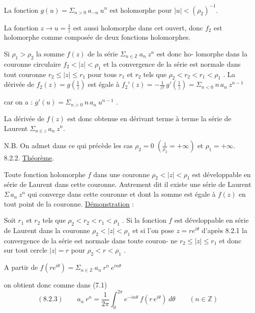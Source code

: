 
La fonction $g(u) = \Sigma_{n > 0}\ a_{-n}\ u^{n}$ est holomorphe pour $|u| < (\rho_2)^{-1}$.

La fonction $z \longrightarrow u = \frac{1}{z}$ est aussi holomorphe dans cet ouvert, donc $f_2$ est
holomorphe comme composée de deux fonctions holomorphes.

Si $\rho_1 > \rho_2$ la somme $f(z)$ de la série $\Sigma_{n \in \mathbb{Z}}\ a_n\ z^{n}$ est donc ho-%
lomorphe dans la couronne circulaire $f_2 < |z| < \rho_1$ et la convergence de la
série est normale dans tout couronne $r_2 \leq |z| \leq r_1$ pour tous $r_1$ et $r_2$ tels
que $\rho_2 < r_2 < r_1 < \rho_1$ .
La dérivée de $f_2(z) = g(\frac{1}{z})$ est égale à $f_2'(z) = - \frac{1}{z^2}\, g'(\frac{1}{z}) = \Sigma_{n < 0}\ n\, a_n\ z^{n-1}$

car on a : \quad $g'(u) = \Sigma_{n > 0}\ n\, a_n\ u^{n-1}$ .

La dérivée de $f(z)$ est donc obtenue en dérivant terme à terme la série de
Laurent $\Sigma_{n \in z}\ a_n\ z^{n}$.

N.B. On admet dans ce qui précède les cas $\rho_2 = 0$ $(\frac{1}{\rho_2} = + \infty)$ et $\rho_1 = + \infty$.
8.2.2. \uline{Théorème}.

Toute fonction holomorphe $f$ dans une couronne $\rho_2 < |z| < \rho_1$ est
développable en série de Laurent dans cette couronne.
Autrement dit il existe une série de Laurent $\Sigma\, a_n\ z^{n}$ qui converge dans cette
couronne et dont la somme est égale à $f(z)$ en tout point de la couronne.
\uline{Démonstration} :

Soit $r_1$ et $r_2$ tels que $\rho_2 < r_2 < r_1 < \rho_1$ . Si la fonction $f$ est
développable en série de Laurent dans la couronne $\rho_2 < |z| < \rho_1$ et si l'on pose
$z = re^{i\theta}$ d'après 8.2.1 la convergence de la série est normale dans toute couron-%
ne $r_2 \leq |z| \leq r_1$ et donc sur tout cercle $|z| = r$ pour $\rho_2 < r < \rho_1$ .

A partir de $f(re^{i\theta}) = \Sigma_{n \in \mathbb{Z}}\ a_n\ r^{n}\ e^{in\theta}$

on obtient donc comme dans (7.1)
\[
(8.2.3) \qquad a_n\ r^{n} = \frac{1}{2\pi} \int_0^{2\pi} e^{-in\theta}\ f(r\, e^{i\theta})\ d\theta \qquad (n \in \mathbb{Z})
\]

